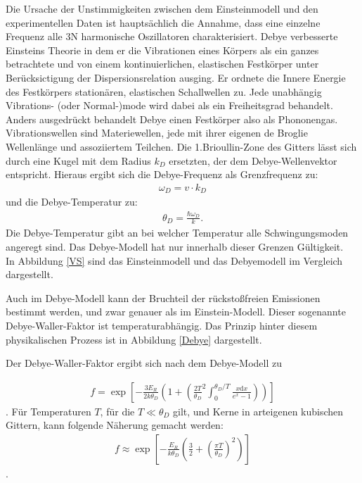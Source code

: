 Die Ursache der Unstimmigkeiten zwischen dem Einsteinmodell und den experimentellen Daten ist hauptsächlich die Annahme, dass eine einzelne Frequenz alle 3N harmonische Oszillatoren charakterisiert. Debye verbesserte Einsteins Theorie in dem er die Vibrationen eines Körpers als ein ganzes betrachtete und von einem kontinuierlichen, elastischen Festkörper unter Berücksictigung der Dispersionsrelation ausging. Er ordnete die Innere Energie des Festkörpers stationären, elastischen Schallwellen zu. Jede unabhängig Vibrations- (oder Normal-)mode wird dabei als ein Freiheitsgrad behandelt.
Anders ausgedrückt behandelt Debye einen Festkörper also als Phononengas. Vibrationswellen sind Materiewellen, jede mit ihrer eigenen de Broglie Wellenlänge und assoziiertem Teilchen. 
Die 1.Brioullin-Zone des Gitters lässt sich durch eine Kugel mit dem  Radius  $k_D$ ersetzten, der dem Debye-Wellenvektor entspricht.  Hieraus ergibt sich die Debye-Frequenz als Grenzfrequenz zu:
\begin{align}
\omega_D = v\cdot k_D
\end{align}
und die Debye-Temperatur zu:
\begin{align}
\theta_D = \frac{\hbar\omega_D}{k}.
\end{align}
Die Debye-Temperatur gibt an bei welcher Temperatur alle Schwingungsmoden angeregt sind. Das Debye-Modell hat nur innerhalb dieser Grenzen Gültigkeit.\\
In Abbildung \ref{VS} sind das Einsteinmodell und das Debyemodell im Vergleich dargestellt.


Auch im Debye-Modell kann der Bruchteil der rückstoßfreien Emissionen bestimmt werden, und zwar genauer als im Einstein-Modell. Dieser sogenannte Debye-Waller-Faktor ist temperaturabhängig. Das Prinzip hinter diesem physikalischen Prozess ist in Abbildung \ref{Debye} dargestellt.


Der Debye-Waller-Faktor ergibt sich nach dem Debye-Modell zu

\begin{align}
f = \exp\left[ -\frac{3E_R}{2k\theta_D}\left( 1+\left( \frac{2T}{\theta_D}^2 \int_{0}^{\theta_D/T}\frac{x\mathrm{d}x}{e^x-1}\right) \right) \right]
\end{align}.
Für Temperaturen $T$, für die $T \ll \theta_D$ gilt, und Kerne in arteigenen kubischen Gittern, kann folgende Näherung gemacht werden:
\begin{align}
f\approx \exp\left[ -\frac{E_R}{k\theta_D} \left(\frac{3}{2} + \left(\frac{\pi T}{\theta_D}\right)^2 \right) \right]
\end{align}.

